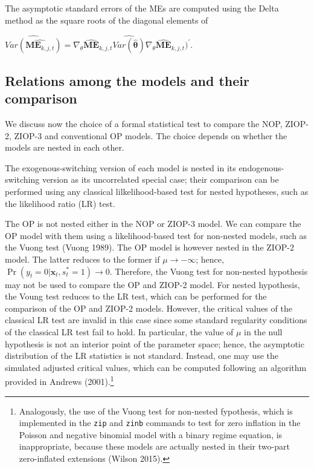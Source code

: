 \documentclass[letterpaper,fleqn,12pt]{article}
\begin{document}
The asymptotic standard errors of the MEs are computed using the Delta
method as the square roots of the diagonal elements of

\begin{center}
$\widehat{Var(\widehat{\underset{}{\mathbf{ME}_{k,j,t}}})}=\nabla _{\theta }%
\widehat{\mathbf{ME}}_{k,j,t}\widehat{Var(\widehat{\mathbf{\theta }})}\nabla
_{\theta }\widehat{\mathbf{ME}}_{k,j,t})^{\prime }$.
\end{center}

\subsection{\noindent Relations among the models and their comparison}

We discuss now the choice of a formal statistical test to compare the NOP,
ZIOP-2, ZIOP-3 and conventional OP models. The choice depends on whether the
models are nested in each other.

The exogenous-switching version of each model is nested in its
endogenous-switching version as its uncorrelated special case; their
comparison can be performed using any classical lilkelihood-based test for
nested hypotheses, such as the likelihood ratio (LR) test.

The OP is not nested either in the NOP or ZIOP-3 model. We can compare the
OP model with them using a likelihood-based test for non-nested models, such
as the Vuong test (Vuong 1989). The OP model is however nested in the ZIOP-2
model. The latter reduces to the former if $\mu \rightarrow -\infty $;
hence, $\Pr (y_{t}=0|\mathbf{x}_{t},s_{t}^{\ast }=1)\rightarrow 0$.
Therefore, the Vuong test for non-nested hypothesis may not be used to
compare the OP and ZIOP-2 model. For nested hypothesis, the Voung test
reduces to the LR test, which can be performed for the comparison of the OP
and ZIOP-2 models. However, the critical values of the classical LR test are
invalid in this case since some standard regularity conditions of the
classical LR test fail to hold. In particular, the value of $\mu $ in the
null hypothesis is not an interior point of the parameter space; hence, the
asymptotic distribution of the LR statistics is not standard. Instead, one
may use the simulated adjusted critical values, which can be computed
following an algorithm provided in Andrews (2001).\footnote{%
Analogously, the use of the Vuong test for non-nested fypothesis, which is
implemented in the \texttt{zip} and \texttt{zinb} commands to test for zero
inflation in the Poisson and negative binomial model with a binary regime
equation, is inappropriate, because these models are actually nested in
their two-part zero-inflated extensions (Wilson 2015).}
\end{document}
